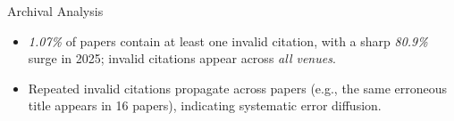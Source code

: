 \begin{keyfindingsSidebar}{Archival Analysis}
\begin{itemize}
    \setlength{\itemsep}{0pt}
    \setlength{\topsep}{0pt}
    \setlength{\partopsep}{0pt}
    \setlength{\parsep}{0pt}
    \item \textit{1.07\%} of papers contain at least one invalid citation, with a sharp \textit{80.9\%} surge in 2025; invalid citations appear across \textit{all venues}.
    \item Repeated invalid citations propagate across papers (e.g., the same erroneous title appears in 16 papers), indicating systematic error diffusion.
\end{itemize}
\end{keyfindingsSidebar}


